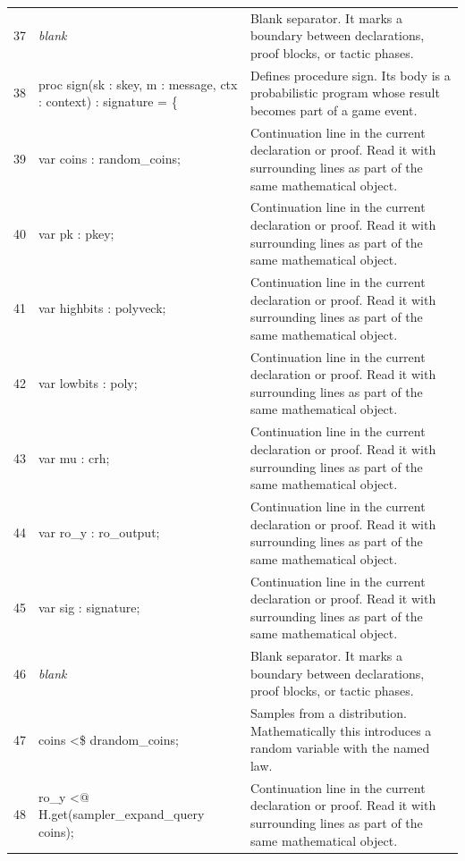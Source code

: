 \documentclass[10pt]{article}
\begin{document}
\begin{longtable}{r L{0.53\textwidth} L{0.37\textwidth}}
37 & {\ttfamily\scriptsize \emph{blank}} & Blank separator.  It marks a boundary between declarations, proof blocks, or tactic phases. \\
38 & {\ttfamily\scriptsize   proc sign(sk : skey, m : message, ctx : context) : signature = \{} & Defines procedure sign.  Its body is a probabilistic program whose result becomes part of a game event. \\
39 & {\ttfamily\scriptsize     var coins : random\_coins;} & Continuation line in the current declaration or proof.  Read it with surrounding lines as part of the same mathematical object. \\
40 & {\ttfamily\scriptsize     var pk : pkey;} & Continuation line in the current declaration or proof.  Read it with surrounding lines as part of the same mathematical object. \\
41 & {\ttfamily\scriptsize     var highbits : polyveck;} & Continuation line in the current declaration or proof.  Read it with surrounding lines as part of the same mathematical object. \\
42 & {\ttfamily\scriptsize     var lowbits : poly;} & Continuation line in the current declaration or proof.  Read it with surrounding lines as part of the same mathematical object. \\
43 & {\ttfamily\scriptsize     var mu : crh;} & Continuation line in the current declaration or proof.  Read it with surrounding lines as part of the same mathematical object. \\
44 & {\ttfamily\scriptsize     var ro\_y : ro\_output;} & Continuation line in the current declaration or proof.  Read it with surrounding lines as part of the same mathematical object. \\
45 & {\ttfamily\scriptsize     var sig : signature;} & Continuation line in the current declaration or proof.  Read it with surrounding lines as part of the same mathematical object. \\
46 & {\ttfamily\scriptsize \emph{blank}} & Blank separator.  It marks a boundary between declarations, proof blocks, or tactic phases. \\
47 & {\ttfamily\scriptsize     coins <\$ drandom\_coins;} & Samples from a distribution.  Mathematically this introduces a random variable with the named law. \\
48 & {\ttfamily\scriptsize     ro\_y <@ H.get(sampler\_expand\_query coins);} & Continuation line in the current declaration or proof.  Read it with surrounding lines as part of the same mathematical object. \\

\end{longtable}
\end{document}
